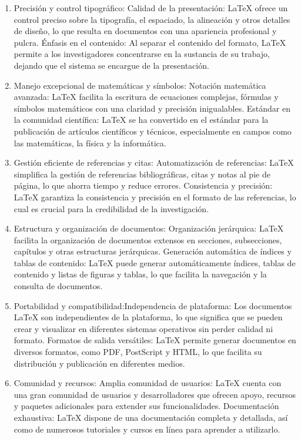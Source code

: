 \documentclass[10pt]{article}
\begin{document}
\begin{enumerate}  
    \item Precisión y control tipográfico:
Calidad de la presentación: LaTeX ofrece un control preciso sobre la tipografía, el espaciado, la alineación y otros detalles de diseño, lo que resulta en documentos con una apariencia profesional y pulcra.
Énfasis en el contenido: Al separar el contenido del formato, LaTeX permite a los investigadores concentrarse en la sustancia de su trabajo, dejando que el sistema se encargue de la presentación. 
    \item Manejo excepcional de matemáticas y símbolos:
Notación matemática avanzada: LaTeX facilita la escritura de ecuaciones complejas, fórmulas y símbolos matemáticos con una claridad y precisión inigualables.
Estándar en la comunidad científica: LaTeX se ha convertido en el estándar para la publicación de artículos científicos y técnicos, especialmente en campos como las matemáticas, la física y la informática.
    \item Gestión eficiente de referencias y citas:
Automatización de referencias: LaTeX simplifica la gestión de referencias bibliográficas, citas y notas al pie de página, lo que ahorra tiempo y reduce errores.
Consistencia y precisión: LaTeX garantiza la consistencia y precisión en el formato de las referencias, lo cual es crucial para la credibilidad de la investigación.
	\item Estructura y organización de documentos:
Organización jerárquica: LaTeX facilita la organización de documentos extensos en secciones, subsecciones, capítulos y otras estructuras jerárquicas.
Generación automática de índices y tablas de contenido: LaTeX puede generar automáticamente índices, tablas de contenido y listas de figuras y tablas, lo que facilita la navegación y la consulta de documentos.
	\item Portabilidad y compatibilidad:Independencia de plataforma: Los documentos LaTeX son independientes de la plataforma, lo que significa que se pueden crear y visualizar en diferentes sistemas operativos sin perder calidad ni formato.
Formatos de salida versátiles: LaTeX permite generar documentos en diversos formatos, como PDF, PostScript y HTML, lo que facilita su distribución y publicación en diferentes medios.
	\item Comunidad y recursos:
Amplia comunidad de usuarios: LaTeX cuenta con una gran comunidad de usuarios y desarrolladores que ofrecen apoyo, recursos y paquetes adicionales para extender sus funcionalidades.
Documentación exhaustiva: LaTeX dispone de una documentación completa y detallada, así como de numerosos tutoriales y cursos en línea para aprender a utilizarlo.
\end{enumerate}  
\end{document}
